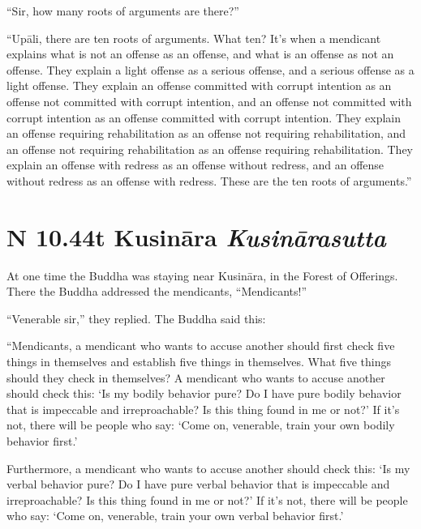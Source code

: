 \documentclass[12pt,openany]{book}%
\newcommand*{\suttatitleacronym}[1]{\smaller[2]{#1}\vspace*{.3em}}
\newcommand*{\suttatitletranslation}[1]{\linebreak{#1}}
\newcommand*{\suttatitleroot}[1]{\linebreak\smaller[2]\itshape{#1}}
\newcommand*{\tocacronym}[1]{\hspace*{-3.3em}{#1}\quad}
\newcommand*{\toctranslation}[1]{#1}
\newcommand*{\tocroot}[1]{(\textit{#1})}
\begin{document}
“Sir, how many roots of arguments are there?” 

“\textsanskrit{Upāli}, there are ten roots of arguments. What ten? It’s when a mendicant explains what is not an offense as an offense, and what is an offense as not an offense. They explain a light offense as a serious offense, and a serious offense as a light offense. They explain an offense committed with corrupt intention as an offense not committed with corrupt intention, and an offense not committed with corrupt intention as an offense committed with corrupt intention. They explain an offense requiring rehabilitation as an offense not requiring rehabilitation, and an offense not requiring rehabilitation as an offense requiring rehabilitation. They explain an offense with redress as an offense without redress, and an offense without redress as an offense with redress. These are the ten roots of arguments.” 

%
\section*{{\suttatitleacronym AN 10.44}{\suttatitletranslation At Kusināra }{\suttatitleroot Kusinārasutta}}
\addcontentsline{toc}{section}{\tocacronym{AN 10.44} \toctranslation{At Kusināra } \tocroot{Kusinārasutta}}

At one time the Buddha was staying near \textsanskrit{Kusināra}, in the Forest of Offerings. There the Buddha addressed the mendicants, “Mendicants!” 

“Venerable sir,” they replied. The Buddha said this: 

“Mendicants, a mendicant who wants to accuse another should first check five things in themselves and establish five things in themselves. What five things should they check in themselves? A mendicant who wants to accuse another should check this: ‘Is my bodily behavior pure? Do I have pure bodily behavior that is impeccable and irreproachable? Is this thing found in me or not?’ If it’s not, there will be people who say: ‘Come on, venerable, train your own bodily behavior first.’ 

Furthermore, a mendicant who wants to accuse another should check this: ‘Is my verbal behavior pure? Do I have pure verbal behavior that is impeccable and irreproachable? Is this thing found in me or not?’ If it’s not, there will be people who say: ‘Come on, venerable, train your own verbal behavior first.’ 
\end{document}
